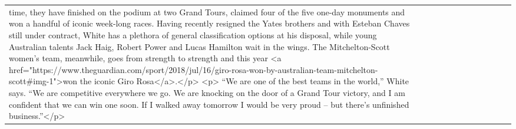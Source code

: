 \documentclass[]{article}
\begin{document}
\begin{table}[!h]
\begin{tabular}[t]{llllllllllll}
time, they have finished on the podium at two Grand Tours, claimed four of the five one-day monuments and won a handful of iconic week-long races. Having recently resigned the Yates brothers and with Esteban Chaves still under contract, White has a plethora of general classification options at his disposal, while young Australian talents Jack Haig, Robert Power and Lucas Hamilton wait in the wings. The Mitchelton-Scott women’s team, meanwhile, goes from strength to strength and this year <a href="https://www.theguardian.com/sport/2018/jul/16/giro-rosa-won-by-australian-team-mitchelton-scott\#img-1">won the iconic Giro Rosa</a>.</p> <p> “We are one of the best teams in the world,” White says. “We are competitive everywhere we go. We are knocking on the door of a Grand Tour victory, and I am confident that we can win one soon. If I walked away tomorrow I would be very proud – but there’s unfinished business.”</p>\\

\end{tabular}
\end{table}
\end{document}
